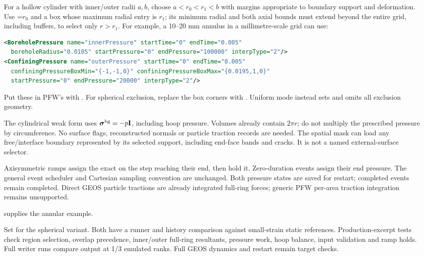 For a hollow cylinder with inner/outer radii $a,b$, choose
$a<r_0<r_1<b$ with margins appropriate to boundary support and deformation.
Use =$r_0$ and a box whose maximum radial entry is
$r_1$; its minimum radial and both axial bounds must extend beyond the entire
grid, including buffers, to select only $r>r_1$. For example, a 10--20 mm
annulus in a millimetre-scale grid can use:
\begin{lstlisting}[language=XML]
<BoreholePressure name="innerPressure" startTime="0" endTime="0.005"
  boreholeRadius="0.0105" startPressure="0" endPressure="100000" interpType="2"/>
<ConfiningPressure name="outerPressure" startTime="0" endTime="0.005"
  confiningPressureBoxMin="{-1,-1,0}" confiningPressureBoxMax="{0.0195,1,0}"
  startPressure="0" endPressure="20000" interpType="2"/>
\end{lstlisting}
Put these in PFW's  with .
For spherical exclusion, replace the box corners with
. Uniform mode instead sets
 and omits all exclusion geometry.

The cylindrical weak form uses $\boldsymbol\sigma^{\rm bg}=-p\mathbf I$,
including hoop pressure. Volumes already contain $2\pi r$; do not multiply
the prescribed pressure by circumference. No surface flags, reconstructed
normals or particle traction records are needed. The spatial mask can load
any free/interface boundary represented by its selected support, including
end-face bands and cracks. It is not a named external-surface selector.

Axisymmetric ramps assign the exact  on the step reaching
their end, then hold it. Zero-duration events assign their end pressure.
The general event scheduler and Cartesian sampling convention are unchanged.
Both pressure states are saved for restart; completed events remain completed.
Direct GEOS particle tractions are already integrated full-ring forces;
generic PFW per-area traction integration remains unsupported.

 supplies the annular example.

Set  for the spherical variant.
Both have a runner and history comparison against small-strain static
references. Production-excerpt tests check region
selection, overlap precedence, inner/outer full-ring resultants, pressure work,
hoop balance, input validation and ramp holds. Full writer runs compare output
at 1/3 emulated ranks. Full GEOS dynamics and restart remain target checks.

